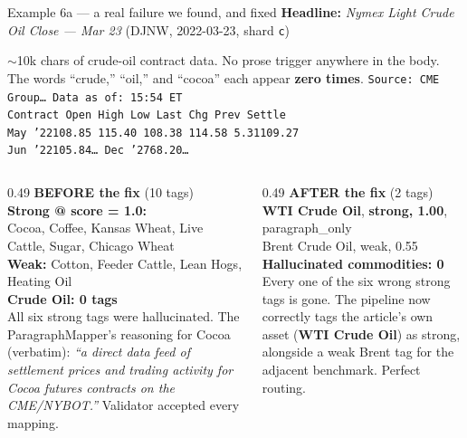 \documentclass[10pt,aspectratio=169]{beamer}
\begin{document}
\begin{frame}[fragile]{Example 6a --- a real failure we found, and fixed}
  \scriptsize
  \textbf{Headline:} \emph{Nymex Light Crude Oil Close --- Mar 23} (DJNW, 2022-03-23, shard \texttt{c})

  \vspace{0.3em}
  $\sim$10k chars of crude-oil contract data. No prose trigger anywhere in the body. The words
  ``crude,'' ``oil,'' and ``cocoa'' each appear \textbf{zero times}.
  \vspace{0.2em}
  \tiny
  \texttt{Source: CME Group\ldots\ Data as of: 15:54 ET\\
  Contract  Open   High   Low   Last  Chg   Prev Settle\\
  May '22\hspace{0.5em}108.85 115.40 108.38 114.58 5.31\hspace{0.5em}109.27\\
  Jun '22\hspace{0.5em}105.84\ldots\hspace{2em} Dec '27\hspace{0.5em}\phantom{00}68.20\ldots}

  \vspace{0.4em}
  \scriptsize
  \begin{columns}[T,onlytextwidth]
    \begin{column}{0.49\textwidth}
      \textbf{\textcolor{red!70!black}{BEFORE the fix}} \quad (10 tags)\\[0.2em]
      \textbf{Strong @ score = 1.0:}\\
      Cocoa, Coffee, Kansas Wheat, Live Cattle, Sugar, Chicago Wheat\\[0.3em]
      \textbf{Weak:} Cotton, Feeder Cattle, Lean Hogs, Heating Oil\\[0.3em]
      \textbf{Crude Oil: 0 tags}\\[0.3em]
      All six strong tags were hallucinated. The ParagraphMapper's reasoning for Cocoa (verbatim):
      \emph{``a direct data feed of settlement prices and trading activity for Cocoa futures
      contracts on the CME/NYBOT.''} Validator accepted every mapping.
    \end{column}
    \begin{column}{0.49\textwidth}
      \textbf{\textcolor{goodgreen}{AFTER the fix}} \quad (2 tags)\\[0.2em]
      \textbf{WTI Crude Oil}, \textbf{strong, 1.00}, paragraph\_only\\[0.1em]
      Brent Crude Oil, weak, 0.55\\[0.3em]
      \textbf{Hallucinated commodities: 0}\\[0.3em]
      Every one of the six wrong strong tags is gone. The pipeline now correctly tags the
      article's own asset (\textbf{WTI Crude Oil}) as strong, alongside a weak Brent tag for
      the adjacent benchmark. Perfect routing.
    \end{column}
  \end{columns}


\end{frame}
\end{document}
